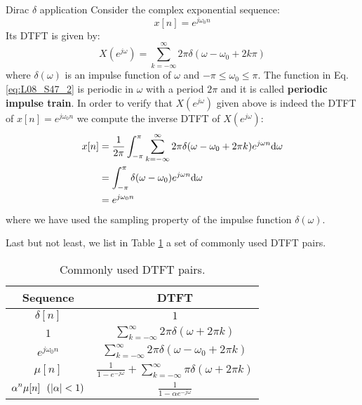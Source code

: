 \documentclass[../../main/main.tex]{subfiles}
\begin{document}
\begin{example}{Dirac \( \delta \) application}{}
    Consider the complex exponential sequence:
    \begin{equation}
        x[n]
        =
        e^{j\omega_{0}n}
        \label{eq:L08_S47_1}
    \end{equation}
    Its DTFT is given by:
    \begin{equation}
        X(e^{j\omega})
        =
        \sum_{k=-\infty}^{\infty} 2\pi \delta(\omega - \omega_{0} + 2k\pi)
        \label{eq:L08_S47_2}
    \end{equation}
    where \( \delta(\omega) \) is an impulse function of \( \omega \) and \( -\pi \le \omega_{0} \le \pi \).
    The function in Eq. \ref{eq:L08_S47_2} is periodic in \( \omega \) with a period \( 2\pi \) and it is called \textbf{periodic impulse train}.
    In order to verify that \( X(e^{j\omega}) \) given above is indeed the DTFT of \( x[n] = e^{j\omega_{0}n} \) we compute the inverse DTFT of \( X(e^{j\omega}) \):
    \begin{align}
        x[n]
        &=
            \frac{1}{2\pi} \int_{-\pi}^{\pi} \sum_{k=-\infty}^{\infty} 2\pi \delta(\omega - \omega_{0} + 2\pi k) e^{j\omega n} \mathrm{d}{\omega}   \nonumber   \\
        &=
            \int_{-\pi}^{\pi} \delta(\omega - \omega_{0}) e^{j\omega n} \mathrm{d}{\omega}  \nonumber   \\
        &=
            e^{j\omega_{0}n}
    \end{align}
    where we have used the sampling property of the impulse function \( \delta(\omega) \).
\end{example}

Last but not least, we list in Table \ref{tab:L08_S50_1} a set of commonly used DTFT pairs.

\begin{table}[!h]
    \centering
    \begin{tabular}{cc}
        \toprule
        \textbf{Sequence}   &   \textbf{DTFT}   \\
        \midrule
        \( \displaystyle \delta[n] \) &   \( \displaystyle 1 \) \\
        \( \displaystyle 1 \)   &   \( \displaystyle \sum_{k=-\infty}^{\infty} 2\pi \delta(\omega + 2\pi k) \)  \\
        \( \displaystyle e^{j\omega_{0}n} \)    &   \( \displaystyle \sum_{k=-\infty}^{\infty} 2\pi \delta(\omega - \omega_{0} + 2\pi k) \) \\
        \( \displaystyle \mu[n] \)  &   \( \displaystyle \frac{1}{1 - e^{-j\omega}} + \sum_{k=-\infty}^{\infty} \pi \delta(\omega + 2\pi k) \)  \\
        \( \displaystyle \alpha^{n}\mu[n] \ \ (\abs{\alpha} < 1 ) \)    &   \( \displaystyle \frac{1}{1 - \alpha e^{-j \omega}} \)  \\
        \bottomrule
    \end{tabular}
    \caption{\label{tab:L08_S50_1} Commonly used DTFT pairs.}
\end{table}
\end{document}
